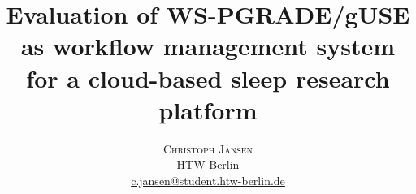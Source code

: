 \documentclass[twoside]{article}
\title{\vspace{-15mm}%
	\fontsize{24pt}{10pt}\selectfont
	\textbf{Evaluation of WS-PGRADE/gUSE as workflow management system for a cloud-based sleep research platform}
	}
\author{%
	\large
	\textsc{Christoph Jansen} \\[2mm]
	\normalsize	HTW Berlin \\
	\normalsize	\href{mailto:c.jansen@student.htw-berlin.de}{c.jansen@student.htw-berlin.de}
	\vspace{-5mm}
	}
\date{}
\begin{document}
\maketitle
\thispagestyle{fancy}


	

\begin{multicols}{2}



















\end{multicols}

\newpage
\begin{subappendices}

\appendix


\end{subappendices}
\end{document}

